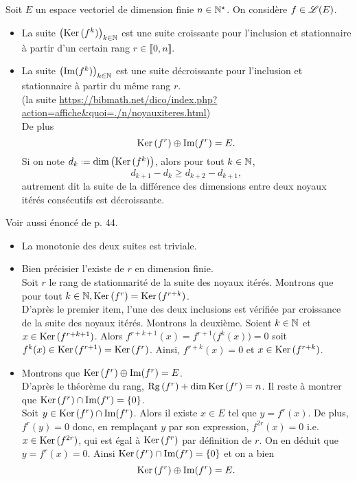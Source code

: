\begin{prop}{}
    Soit $E$ un espace vectoriel de dimension finie $n \in \mathbb{N}^\star$. On considère $f \in \mathscr{L}(E)$.
    \begin{itemize}
        \item La suite $\left( \mathrm{Ker}\,(f^k) \right)_{k \in \mathbb{N}}$ est une suite croissante pour l'inclusion et stationnaire à partir d'un certain rang $r \in \llbracket 0, n \rrbracket$.
        \item La suite $\left( \Im(f^k) \right)_{k \in \mathbb{N}}$ est une suite décroissante pour l'inclusion et stationnaire à partir du même rang $r$. \\
        (la suite \url{https://bibmath.net/dico/index.php?action=affiche&quoi=./n/noyauxiteres.html}) \\De plus
        $$\mathrm{Ker}\,(f^r) \oplus \Im(f^r) = E.$$
        Si on note $d_k \defeq \dim \big(\Ker(f^k) \big)$, alors pour tout $k \in \mathbb{N}$, 
        $$d_{k+1} - d_k \geqslant d_{k+2} - d_{k+1},$$
        autrement dit la suite de la différence des dimensions entre deux noyaux itérés consécutifs est décroissante. 
    \end{itemize}
\end{prop} 

Voir aussi énoncé de \cite{exos_oraux} p. 44.

\begin{preuve}
    \begin{itemize}
        \item La monotonie des deux suites est triviale. 
        \item Bien précisier l'existe de $r$ en dimension finie. \\
        Soit $r$ le rang de stationnarité de la suite des noyaux itérés. Montrons que pour tout $k \in \mathbb{N}, \mathrm{Ker}\,(f^r) = \mathrm{Ker}\,(f^{r+k})$. \\
        D'après le premier item, l'une des deux inclusions est vérifiée par croissance de la suite des noyaux itérés. Montrons la deuxième. Soient $k \in \mathbb{N}$ et $x \in \mathrm{Ker}\,(f^{r+k+1})$. Alors $f^{r+k+1}(x) = f^{r+1} \big(f^k(x) \big) = 0$ soit $f^k(x) \in \mathrm{Ker}\,(f^{r+1}) = \mathrm{Ker}\,(f^r)$. Ainsi, $f^{r+k}(x) = 0$ et $x \in \mathrm{Ker}\,(f^{r+k})$.
        \item Montrons que $\mathrm{Ker}\,(f^r) \oplus \Im(f^r) = E$. \\
        D'après le théorème du rang, $\mathrm{Rg}\,(f^r) + \dim \mathrm{Ker}\,(f^r) = n$. Il reste à montrer que $\mathrm{Ker}\,(f^r) \cap \Im(f^r) = \{ 0 \}$. \\
        Soit $y \in \mathrm{Ker}\,(f^r) \cap \Im(f^r)$. Alors il existe $x \in E$ tel que $y = f^r(x)$. De plus, $f^r(y) = 0$ donc, en remplaçant $y$ par son expression, $f^{2r}(x) = 0$ i.e. $x \in \mathrm{Ker}\,(f^{2r})$, qui est égal à $\mathrm{Ker}\,(f^r)$ par définition de $r$. On en déduit que $y = f^r(x) = 0$. Ainsi $\mathrm{Ker}\,(f^r) \cap \Im(f^r) = \{ 0 \}$ et on a bien
        $$\mathrm{Ker}\,(f^r) \oplus \Im(f^r) = E.$$
    \end{itemize}
\end{preuve}

